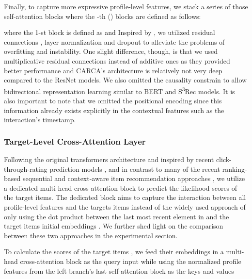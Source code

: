 \documentclass[sigconf,natbib=true]{acmart}
\begin{document}
Finally, to capture more expressive profile-level features, we stack a series of those self-attention blocks where the -th () blocks are defined as follows:

 

 

\noindent where the 1-st block is defined as  and  
Inspired by \cite{vaswani2017attention,kang2018self}, we utilized residual connections \cite{he2016deep}, layer normalization \cite{ba2016layer} and dropout \cite{srivastava2014dropout} to alleviate the problems of overfitting and instability. One slight difference, though, is that we used multiplicative residual connections instead of additive ones as they provided better performance and CARCA's architecture is relatively not very deep compared to the ResNet models. We also omitted the causality constrain to allow bidirectional representation learning similar to BERT\cite{devlin2019bert} and S\textsuperscript{3}Rec \cite{ZhouWZZWZWW20} models. It is also important to note that we omitted the positional encoding since this information already exists explicitly in the contextual features such as the interaction's timestamp.


\subsubsection{Target-Level Cross-Attention Layer}
Following the original transformers architecture and inspired by recent click-through-rating prediction models \cite{zhou2019deep}, and in contrast to many of the recent ranking-based sequential and context-aware item recommendation approaches \cite{kang2018self,ZhouWZZWZWW20,wu2020sse,wang2020time,wang2020next}, we utilize a dedicated multi-head cross-attention block to predict the likelihood scores of the target items. The dedicated block aims to capture the interaction between all profile-level features  and the targets items instead of the widely used approach of only using the dot product between the last most recent element in  and the target items initial embeddings . We further shed light on the comparison between these two approaches in the experimental section.

To calculate the scores  of the target items , we feed their embeddings in a multi-head cross-attention block as the query input while using the normalized profile features  from the left branch's last self-attention block as the keys and values

 

 
\end{document}
